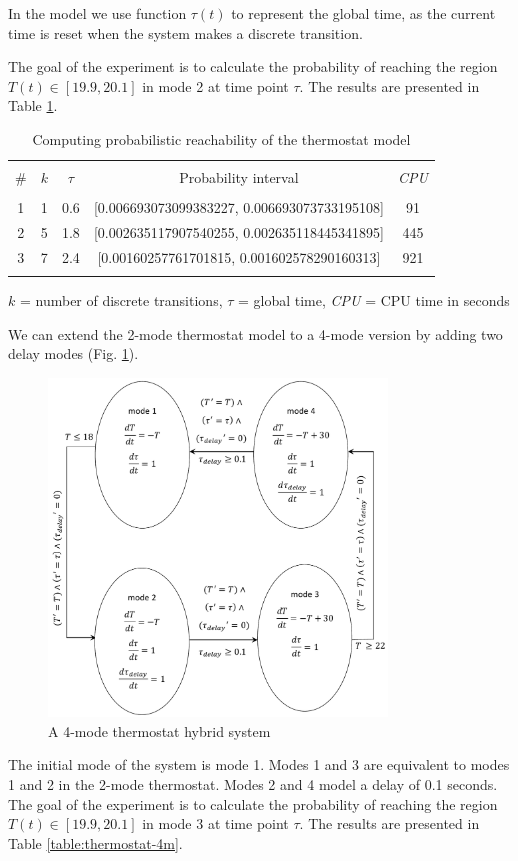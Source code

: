 \begin{remark}
In the model we use function $\tau(t)$ to represent the global time, as the current
time is reset when the system makes a discrete transition.
\end{remark}

The goal of the experiment is to calculate the probability of reaching the region $T(t) \in [19.9, 20.1]$ in mode 2 at time point $\tau$. The results are presented in Table \ref{table:thermostat-2m}.

\begin{table}[ht] 
\caption{Computing probabilistic reachability of the thermostat model}
\centering
\begin{tabular}{c c c c c}
\hline\hline \\ [0.5ex]
\# & $k$ & $\tau$ & Probability interval & {\em CPU}\\ [0.5ex] 

\hline \\ [0.5ex]
1 & 1 & 0.6 & [0.006693073099383227, 0.006693073733195108] & 91\\ [0.5ex]
2 & 5 & 1.8 & [0.002635117907540255, 0.002635118445341895] & 445\\ [0.5ex] 
3 & 7 & 2.4 & [0.00160257761701815, 0.001602578290160313] & 921\\ [0.5ex] 
\hline \\ [0.5ex]
\end{tabular} 
\label{table:thermostat-2m}

$k$ = number of discrete transitions, $\tau$ = global time,
{\em CPU} = CPU time in seconds

\end{table}

We can extend the 2-mode thermostat model to a 4-mode version by adding two 
delay modes (Fig. \ref{fig:thermostat-4m}).
\begin{figure}[ht!] 
\centering
\includegraphics[width=90mm]{thermostat-4m}
\caption{A 4-mode thermostat hybrid system}
\label{fig:thermostat-4m}
\end{figure}
The initial mode of the system is mode 1. Modes 1 and 3 are equivalent to modes 1 and 2 in 
the 2-mode thermostat. Modes 2 and 4 model a delay of 0.1 seconds.
The goal of the experiment is to calculate the probability of reaching the region 
$T(t) \in [19.9, 20.1]$ in mode 3 at time point $\tau$. The results are presented in 
Table \ref{table:thermostat-4m}.

